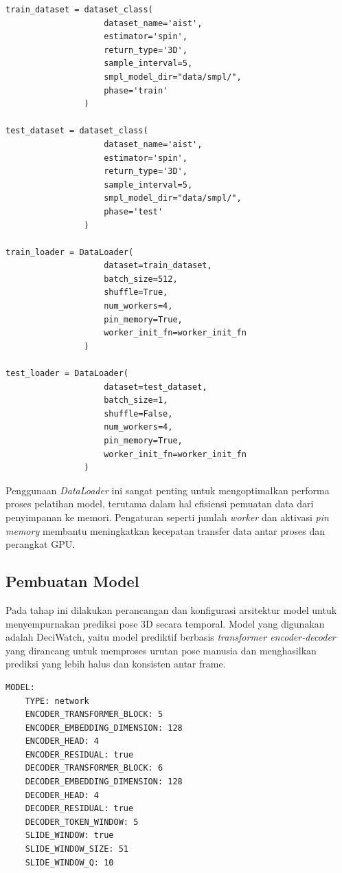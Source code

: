 \begin{lstlisting}[style=plainbox, caption={Inisialisasi \textit{dataset} dan \textit{DataLoader} untuk pelatihan dan pengujian}, label={lst:dataloader}]
train_dataset = dataset_class(
                    dataset_name='aist',
                    estimator='spin',
                    return_type='3D',
                    sample_interval=5,
                    smpl_model_dir="data/smpl/",
                    phase='train'
                )

test_dataset = dataset_class(
                    dataset_name='aist',
                    estimator='spin',
                    return_type='3D',
                    sample_interval=5,
                    smpl_model_dir="data/smpl/",
                    phase='test'
                )

train_loader = DataLoader(
                    dataset=train_dataset,
                    batch_size=512,
                    shuffle=True,
                    num_workers=4,
                    pin_memory=True,
                    worker_init_fn=worker_init_fn
                )

test_loader = DataLoader(
                    dataset=test_dataset,
                    batch_size=1,
                    shuffle=False,
                    num_workers=4,
                    pin_memory=True,
                    worker_init_fn=worker_init_fn
                )

\end{lstlisting}

Penggunaan \textit{DataLoader} ini sangat penting untuk mengoptimalkan performa proses pelatihan model, terutama dalam hal efisiensi pemuatan data dari penyimpanan ke memori. Pengaturan seperti jumlah \textit{worker} dan aktivasi \textit{pin memory} membantu meningkatkan kecepatan transfer data antar proses dan perangkat GPU.


\subsection{Pembuatan Model}

Pada tahap ini dilakukan perancangan dan konfigurasi arsitektur model untuk menyempurnakan prediksi pose 3D secara temporal. Model yang digunakan adalah DeciWatch, yaitu model prediktif berbasis \textit{transformer encoder-decoder} yang dirancang untuk memproses urutan pose manusia dan menghasilkan prediksi yang lebih halus dan konsisten antar frame.

\begin{lstlisting}[style=plainbox, caption={Potongan isi file {config.yaml}}, captionpos=t, label={lst:config_yaml}]
MODEL:
    TYPE: network
    ENCODER_TRANSFORMER_BLOCK: 5
    ENCODER_EMBEDDING_DIMENSION: 128
    ENCODER_HEAD: 4
    ENCODER_RESIDUAL: true
    DECODER_TRANSFORMER_BLOCK: 6
    DECODER_EMBEDDING_DIMENSION: 128
    DECODER_HEAD: 4
    DECODER_RESIDUAL: true
    DECODER_TOKEN_WINDOW: 5
    SLIDE_WINDOW: true
    SLIDE_WINDOW_SIZE: 51
    SLIDE_WINDOW_Q: 10
\end{lstlisting}

